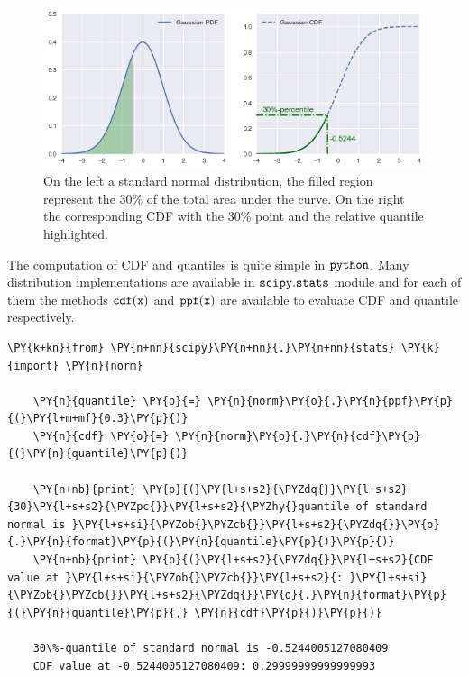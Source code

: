 \begin{figure}[htb]
	\centering
	\includegraphics[width=1.\textwidth]{figures/percentile.png}
	\caption{On the left a standard normal distribution, the filled region represent the 30\% of the total area
		under the curve. On the right the corresponding CDF with the 30\% point and the relative quantile highlighted.}
	\label{fig:percentile}
\end{figure}

The computation of CDF and quantiles is quite simple in \(\tt{python}\).
Many distribution implementations are available in \(\tt{scipy.stats}\)
module and for each of them the methods \(\tt{cdf(x)}\) and
\(\tt{ppf(x)}\) are available to evaluate CDF and quantile respectively.

\begin{tcolorbox}[breakable, size=fbox, boxrule=1pt, pad at break*=1mm,colback=cellbackground, colframe=cellborder]
	\begin{Verbatim}[commandchars=\\\{\}]
	\PY{k+kn}{from} \PY{n+nn}{scipy}\PY{n+nn}{.}\PY{n+nn}{stats} \PY{k}{import} \PY{n}{norm}
	
	\PY{n}{quantile} \PY{o}{=} \PY{n}{norm}\PY{o}{.}\PY{n}{ppf}\PY{p}{(}\PY{l+m+mf}{0.3}\PY{p}{)}
	\PY{n}{cdf} \PY{o}{=} \PY{n}{norm}\PY{o}{.}\PY{n}{cdf}\PY{p}{(}\PY{n}{quantile}\PY{p}{)}
	
	\PY{n+nb}{print} \PY{p}{(}\PY{l+s+s2}{\PYZdq{}}\PY{l+s+s2}{30}\PY{l+s+s2}{\PYZpc{}}\PY{l+s+s2}{\PYZhy{}quantile of standard normal is }\PY{l+s+si}{\PYZob{}\PYZcb{}}\PY{l+s+s2}{\PYZdq{}}\PY{o}{.}\PY{n}{format}\PY{p}{(}\PY{n}{quantile}\PY{p}{)}\PY{p}{)}
	\PY{n+nb}{print} \PY{p}{(}\PY{l+s+s2}{\PYZdq{}}\PY{l+s+s2}{CDF value at }\PY{l+s+si}{\PYZob{}\PYZcb{}}\PY{l+s+s2}{: }\PY{l+s+si}{\PYZob{}\PYZcb{}}\PY{l+s+s2}{\PYZdq{}}\PY{o}{.}\PY{n}{format}\PY{p}{(}\PY{n}{quantile}\PY{p}{,} \PY{n}{cdf}\PY{p}{)}\PY{p}{)}
	
	30\%-quantile of standard normal is -0.5244005127080409
	CDF value at -0.5244005127080409: 0.29999999999999993
	\end{Verbatim}
\end{tcolorbox}

